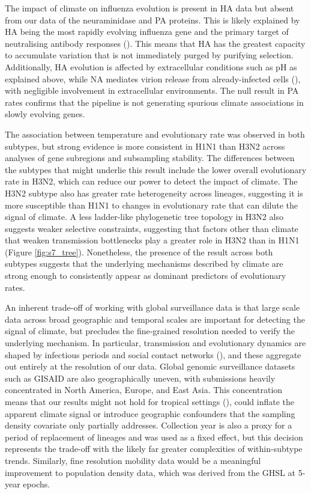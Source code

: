 \documentclass[11pt, a4paper]{article}
\begin{document}
The impact of climate on influenza evolution is present in HA data but absent from our data of the neuraminidase and PA proteins. This is likely explained by HA being the most rapidly evolving influenza gene and the primary target of neutralising antibody responses (\cite{bush_positive_1999, nelson_evolution_2007}). This means that HA has the greatest capacity to accumulate variation that is not immediately purged by purifying selection. Additionally, HA evolution is affected by extracellular conditions such as pH as explained above, while NA mediates virion release from already-infected cells (\cite{guo_kinetic_2018}), with negligible involvement in extracellular environments. The null result in PA rates confirms that the pipeline is not generating spurious climate associations in slowly evolving genes.

The association between temperature and evolutionary rate was observed in both subtypes, but strong evidence is more consistent in H1N1 than H3N2 across analyses of gene subregions and subsampling stability. The differences between the subtypes that might underlie this result include the lower overall evolutionary rate in H3N2, which can reduce our power to detect the impact of climate. The H3N2 subtype also has greater rate heterogeneity across lineages, suggesting it is more susceptible than H1N1 to changes in evolutionary rate that can dilute the signal of climate. A less ladder-like phylogenetic tree topology in H3N2 also suggests weaker selective constraints, suggesting that factors other than climate that weaken transmission bottlenecks play a greater role in H3N2 than in H1N1 (Figure \ref{fig:s7_tree}). Nonetheless, the presence of the result across both subtypes suggests that the underlying mechanisms described by climate are strong enough to consistently appear as dominant predictors of evolutionary rates.

An inherent trade-off of working with global surveillance data is that large scale data across broad geographic and temporal scales are important for detecting the signal of climate, but precludes the fine-grained resolution needed to verify the underlying mechanism. In particular, transmission and evolutionary dynamics are shaped by infectious periods and social contact networks (\cite{cauchemez_role_2011, khurana_high-resolution_2024}), and these aggregate out entirely at the resolution of our data. Global genomic surveillance datasets such as GISAID are also geographically uneven, with submissions heavily concentrated in North America, Europe, and East Asia. This concentration means that our results might not hold for tropical settings (\cite{kimura_decoding_2026}), could inflate the apparent climate signal or introduce geographic confounders that the sampling density covariate only partially addresses. Collection year is also a proxy for a period of replacement of lineages and was used as a fixed effect, but this decision represents the trade-off with the likely far greater complexities of within-subtype trends. Similarly, fine resolution mobility data would be a meaningful improvement to population density data, which was derived from the GHSL at 5-year epochs.
\end{document}
